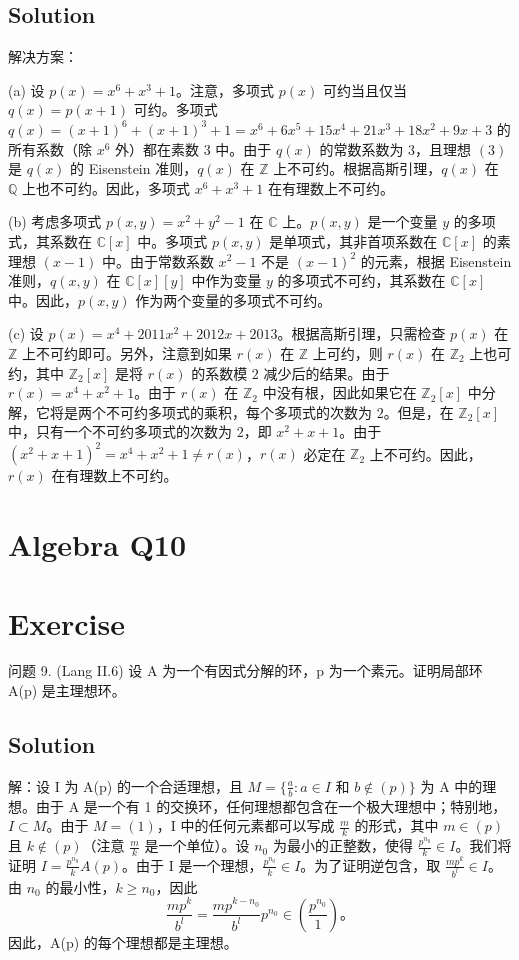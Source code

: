 \documentclass[12pt]{book}
\begin{document}
\subsection*{Solution}
解决方案：

(a) 设 $p(x) = x^6 + x^3 + 1$。注意，多项式 $p(x)$ 可约当且仅当 $q(x) = p(x+1)$ 可约。多项式 $q(x) = (x+1)^6 + (x+1)^3 + 1 = x^6 + 6x^5 + 15x^4 + 21x^3 + 18x^2 + 9x + 3$ 的所有系数（除 $x^6$ 外）都在素数 $3$ 中。由于 $q(x)$ 的常数系数为 $3$，且理想 $(3)$ 是 $q(x)$ 的 Eisenstein 准则，$q(x)$ 在 $\mathbb{Z}$ 上不可约。根据高斯引理，$q(x)$ 在 $\mathbb{Q}$ 上也不可约。因此，多项式 $x^6 + x^3 + 1$ 在有理数上不可约。

(b) 考虑多项式 $p(x,y) = x^2 + y^2 - 1$ 在 $\mathbb{C}$ 上。$p(x,y)$ 是一个变量 $y$ 的多项式，其系数在 $\mathbb{C}[x]$ 中。多项式 $p(x,y)$ 是单项式，其非首项系数在 $\mathbb{C}[x]$ 的素理想 $(x-1)$ 中。由于常数系数 $x^2-1$ 不是 $(x-1)^2$ 的元素，根据 Eisenstein 准则，$q(x,y)$ 在 $\mathbb{C}[x][y]$ 中作为变量 $y$ 的多项式不可约，其系数在 $\mathbb{C}[x]$ 中。因此，$p(x,y)$ 作为两个变量的多项式不可约。

(c) 设 $p(x) = x^4 + 2011x^2 + 2012x + 2013$。根据高斯引理，只需检查 $p(x)$ 在 $\mathbb{Z}$ 上不可约即可。另外，注意到如果 $r(x)$ 在 $\mathbb{Z}$ 上可约，则 $r(x)$ 在 $\mathbb{Z}_2$ 上也可约，其中 $\mathbb{Z}_2[x]$ 是将 $r(x)$ 的系数模 $2$ 减少后的结果。由于 $r(x) = x^4 + x^2 + 1$。由于 $r(x)$ 在 $\mathbb{Z}_2$ 中没有根，因此如果它在 $\mathbb{Z}_2[x]$ 中分解，它将是两个不可约多项式的乘积，每个多项式的次数为 $2$。但是，在 $\mathbb{Z}_2[x]$ 中，只有一个不可约多项式的次数为 $2$，即 $x^2 + x + 1$。由于 $(x^2 + x + 1)^2 = x^4 + x^2 + 1 \neq r(x)$，$r(x)$ 必定在 $\mathbb{Z}_2$ 上不可约。因此，$r(x)$ 在有理数上不可约。
\newpage
\section{Algebra Q10}
\section*{Exercise}
问题 9. (Lang II.6) 设 A 为一个有因式分解的环，p 为一个素元。证明局部环 A(p) 是主理想环。



\subsection*{Solution}
解：设 I 为 A(p) 的一个合适理想，且 $M = \{ \frac{a}{b} : a \in I \text{ 和 } b \notin (p) \}$ 为 A 中的理想。由于 A 是一个有 1 的交换环，任何理想都包含在一个极大理想中；特别地，$I \subset M$。由于 $M = (1)$，I 中的任何元素都可以写成 $\frac{m}{k}$ 的形式，其中 $m \in (p)$ 且 $k \notin (p)$（注意 $\frac{m}{k}$ 是一个单位）。设 $n_0$ 为最小的正整数，使得 $\frac{p^{n_0}}{k} \in I$。我们将证明 $I = \frac{p^{n_0}}{k} A(p)$。由于 I 是一个理想，$\frac{p^{n_0}}{k} \in I$。为了证明逆包含，取 $\frac{mp^k}{b^l} \in I$。由 $n_0$ 的最小性，$k \ge n_0$，因此
\[
\frac{mp^k}{b^l} = \frac{mp^{k-n_0}}{b^l} p^{n_0} \in \left( \frac{p^{n_0}}{1} \right)。
\]
因此，A(p) 的每个理想都是主理想。
\newpage
\end{document}

